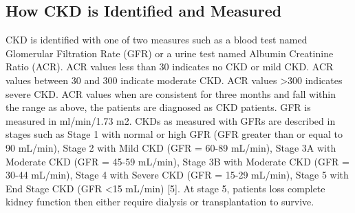 \subsection{How CKD is Identified and Measured}
CKD is identified with one of two measures such as a blood test named Glomerular Filtration Rate (GFR) or a urine test named Albumin Creatinine Ratio (ACR).  ACR values less than 30 indicates no CKD or mild CKD. ACR values between 30 and 300 indicate moderate CKD. ACR values \textgreater 300 indicates severe CKD. ACR values when are consistent for three months and fall within the range as above, the patients are diagnosed as CKD patients. GFR is measured in ml/min/1.73 m2. CKDs as measured with GFRs are described in stages such as Stage 1 with normal or high GFR (GFR greater than or equal to  90 mL/min), Stage 2 with Mild CKD (GFR = 60-89 mL/min), Stage 3A with Moderate CKD (GFR = 45-59 mL/min), Stage 3B with Moderate CKD (GFR = 30-44 mL/min), Stage 4 with Severe CKD (GFR = 15-29 mL/min), Stage 5 with End Stage CKD (GFR \textless 15 mL/min) [5]. At stage 5, patients loss complete kidney function then either require dialysis or transplantation to survive.